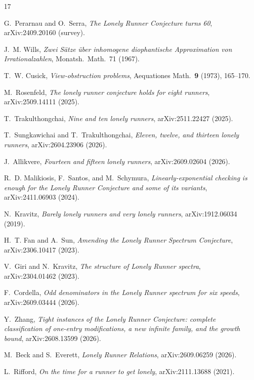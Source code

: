 \documentclass[11pt,a4paper]{article}
\numberwithin{equation}{section}
\theoremstyle{plain}
\theoremstyle{plain}
\theoremstyle{definition}
\theoremstyle{remark}
\begin{document}
\begingroup\sloppy\raggedright
\begin{thebibliography}{17}

G.~Perarnau and O.~Serra,
\emph{The Lonely Runner Conjecture turns 60},
arXiv:2409.20160 (survey).

J.~M. Wills,
\emph{Zwei S\"atze \"uber inhomogene diophantische Approximation von
Irrationalzahlen},
Monatsh.\ Math.\ 71 (1967).

T.~W. Cusick,
\emph{View-obstruction problems},
Aequationes Math.\ \textbf{9} (1973), 165--170.

M.~Rosenfeld,
\emph{The lonely runner conjecture holds for eight runners},
arXiv:2509.14111 (2025).

T.~Trakulthongchai,
\emph{Nine and ten lonely runners},
arXiv:2511.22427 (2025).

T.~Sungkawichai and T.~Trakulthongchai,
\emph{Eleven, twelve, and thirteen lonely runners},
arXiv:2604.23906 (2026).

J.~Allikvere,
\emph{Fourteen and fifteen lonely runners},
arXiv:2609.02604 (2026).

R.~D. Malikiosis, F.~Santos, and M.~Schymura,
\emph{Linearly-exponential checking is enough for the Lonely Runner
Conjecture and some of its variants},
arXiv:2411.06903 (2024).

N.~Kravitz,
\emph{Barely lonely runners and very lonely runners},
arXiv:1912.06034 (2019).

H.~T. Fan and A.~Sun,
\emph{Amending the Lonely Runner Spectrum Conjecture},
arXiv:2306.10417 (2023).

V.~Giri and N.~Kravitz,
\emph{The structure of Lonely Runner spectra},
arXiv:2304.01462 (2023).

F.~Cordella,
\emph{Odd denominators in the Lonely Runner spectrum for six speeds},
arXiv:2609.03444 (2026).

Y.~Zhang,
\emph{Tight instances of the Lonely Runner Conjecture: complete
classification of one-entry modifications, a new infinite family, and the
growth bound},
arXiv:2608.13599 (2026).

M.~Beck and S.~Everett,
\emph{Lonely Runner Relations},
arXiv:2609.06259 (2026).

L.~Rifford,
\emph{On the time for a runner to get lonely},
arXiv:2111.13688 (2021).


\end{thebibliography}
\end{document}
